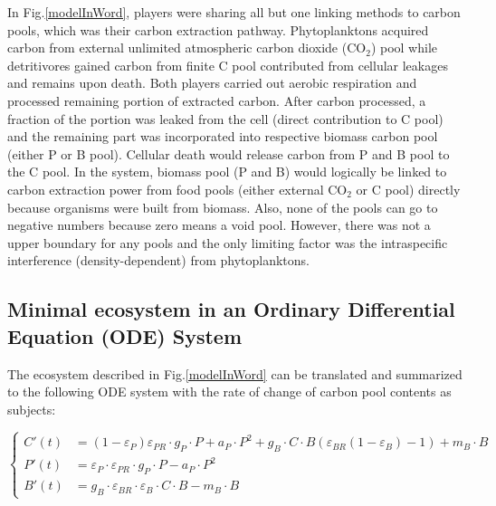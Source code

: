 \documentclass[../thesis.tex]{subfiles} %
\newcommand{\gP}{g_P}
\newcommand{\eP}{\varepsilon_P}
\newcommand{\aP}{a_P}
\newcommand{\ePR}{\varepsilon_{PR}}
\newcommand{\gB}{g_B}
\newcommand{\eB}{\varepsilon_B}
\newcommand{\mB}{m_B}
\newcommand{\eBR}{\varepsilon_{BR}}
\begin{document}
In Fig.\ref{modelInWord}, players were sharing all but one linking methods to carbon pools, which was their carbon extraction pathway.  Phytoplanktons acquired carbon from external unlimited atmospheric carbon dioxide (CO$_2$) pool while detritivores gained carbon from finite C pool contributed from cellular leakages and remains upon death.  Both players carried out aerobic respiration and processed remaining portion of extracted carbon.  After carbon processed, a fraction of the portion was leaked from the cell (direct contribution to C pool) and the remaining part was incorporated into respective biomass carbon pool (either P or B pool).  Cellular death would release carbon from P and B pool to the C pool.  In the system, biomass pool (P and B) would logically be linked to carbon extraction power from food pools (either external CO$_2$ or C pool) directly because organisms were built from biomass.  Also, none of the pools can go to negative numbers because zero means a void pool.  However, there was not a upper boundary for any pools and the only limiting factor was the intraspecific interference (density-dependent) from phytoplanktons.

\subsection{Minimal ecosystem in an Ordinary Differential Equation (ODE) System}
The ecosystem described in Fig.\ref{modelInWord} can be translated and summarized to the following ODE system with the rate of change of carbon pool contents as subjects:

\begin{equation*}\left\{\begin{array}{rl}
    C'(t) &= (1-\eP)\ePR\cdot\gP\cdot P +\aP\cdot P^2 +\gB\cdot C\cdot B(\eBR(1-\eB)-1) +\mB\cdot B\\
    P'(t) &= \eP\cdot\ePR\cdot\gP\cdot P -\aP\cdot P^2\\
    B'(t) &= \gB\cdot\eBR\cdot\eB\cdot C\cdot B -\mB\cdot B
\end{array}\right.\end{equation*}
\end{document}
